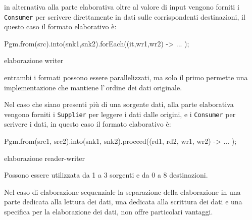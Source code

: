 in alternativa alla parte elaborativa oltre al valore di input vengono forniti i
\texttt{Consumer} per scrivere direttamente in dati sulle corrispondenti
destinazioni, il questo caso il formato elaborativo è:
\begin{elisting}[!htb]
    \begin{javacode}
        Pgm.from(src).into(snk1,snk2).forEach((it,wr1,wr2) -> { ... });
    \end{javacode}
    \caption{elaborazione writer}
    \label{lst:processWriter}
\end{elisting}
entrambi i formati possono essere parallelizzati, ma solo il primo permette una
implementazione che mantiene l'\,ordine dei dati originale.

Nel caso che siano presenti più di una sorgente dati, alla parte elaborativa
vengono forniti i \texttt{Supplier} per leggere i dati dalle origini, e i
\texttt{Consumer} per scrivere i dati, in questo caso il formato elaborativo è:
\begin{elisting}[!htb]
    \begin{javacode}
        Pgm.from(src1, src2).into(snk1, snk2).proceed((rd1, rd2, wr1, wr2) -> { ... });
    \end{javacode}
    \caption{elaborazione reader-writer}
    \label{lst:pullProcess}
\end{elisting}


Possono essere utilizzata da 1 a 3 sorgenti e da 0 a 8 destinazioni.

Nel caso di elaborazione sequenziale la separazione della elaborazione in una
parte dedicata alla lettura dei dati, una dedicata alla scrittura dei dati e una
specifica per la elaborazione dei dati, non offre particolari vantaggi.

